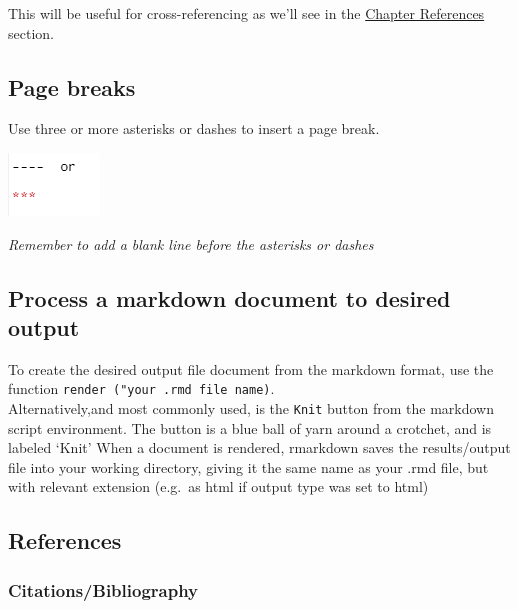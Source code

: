 \documentclass[
]{book}
\let\origfigure\figure
\let\endorigfigure\endfigure
\renewenvironment{figure}[1][2] {
    \expandafter\origfigure\expandafter[H]
} {
    \endorigfigure
}
\begin{document}
This will be useful for cross-referencing as we'll see in the \protect\hyperlink{chapter-references}{Chapter References} section.

\hypertarget{page-breaks}{%
\subsection{Page breaks}\label{page-breaks}}

Use three or more asterisks or dashes to insert a page break.

\begin{figure}
\centering
\includegraphics{tutorial_screenshots/page_break.png}
\caption{page break}
\end{figure}

\emph{Remember to add a blank line before the asterisks or dashes}

\hypertarget{process-a-markdown-document-to-desired-output}{%
\subsection{Process a markdown document to desired output}\label{process-a-markdown-document-to-desired-output}}

To create the desired output file document from the markdown format, use the function \texttt{render\ ("your\ .rmd\ file\ name)}.\\
Alternatively,and most commonly used, is the \texttt{Knit} button from the markdown script environment. The button is a blue ball of yarn around a crotchet, and is labeled `Knit'
When a document is rendered, rmarkdown saves the results/output file into your working directory, giving it the same name as your .rmd file, but with relevant extension (e.g.~as html if output type was set to html)

\hypertarget{references}{%
\subsection{References}\label{references}}

\hypertarget{citationsbibliography}{%
\subsubsection{Citations/Bibliography}\label{citationsbibliography}}
\end{document}
